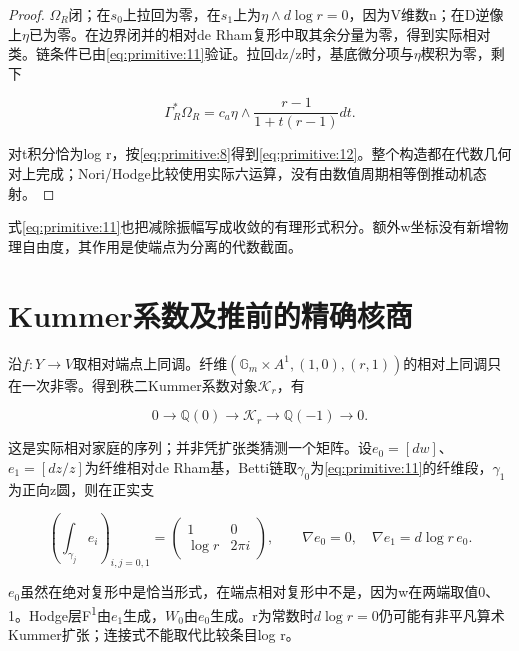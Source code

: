 \documentclass[11pt,a4paper,oneside]{ctexrep}
\theoremstyle{cnplain}
\theoremstyle{definition}
\theoremstyle{remark}
\begin{document}
\begin{proof}

\(\Omega _R\)闭；在\(s_0\)上拉回为零，在\(s_1\)上为\(\eta \wedge d\log  r=0\)，因为V维数n；在D逆像上\(\eta \)已为零。在边界闭并的相对de Rham复形中取其余分量为零，得到实际相对类。链条件已由\eqref{eq:primitive:11}验证。拉回dz/z时，基底微分项与\(\eta \)楔积为零，剩下

\begin{equation}
\Gamma_R^*\Omega_R=c_a\eta\wedge
                  \frac{r-1}{1+t(r-1)}dt.
\end{equation}

对t积分恰为log r，按\eqref{eq:primitive:8}得到\eqref{eq:primitive:12}。整个构造都在代数几何对上完成；Nori/Hodge比较使用实际六运算\cite{tubach}，没有由数值周期相等倒推动机态射。

\end{proof}

式\eqref{eq:primitive:11}也把减除振幅写成收敛的有理形式积分。额外w坐标没有新增物理自由度，其作用是使端点为分离的代数截面。

\section{Kummer系数及推前的精确核商}\label{sec:primitive:5}

沿\(f:Y\to V\)取相对端点上同调。纤维\((\mathbb G_m\times A^{1},{(1,0),(r,1)})\)的相对上同调只在一次非零。得到秩二Kummer系数对象\(\mathcal K_r\)，有

\begin{equation}
0\longrightarrow\mathbb Q(0)\longrightarrow\mathcal K_r
                      \longrightarrow\mathbb Q(-1)\longrightarrow0.       \label{eq:primitive:13}
\end{equation}

这是实际相对家庭的序列；并非凭扩张类猜测一个矩阵。设\(e_0=[dw]\)、\(e_1=[dz/z]\)为纤维相对de Rham基，Betti链取\(\gamma _0\)为\eqref{eq:primitive:11}的纤维段，\(\gamma _1\)为正向z圆，则在正实支

\begin{equation}
\left(\int_{\gamma_j}e_i\right)_{i,j=0,1}
       =\begin{pmatrix}1&0\\\log r&2\pi i\end{pmatrix},\qquad
 \nabla e_0=0,\quad \nabla e_1=d\log r\,e_0.                    \label{eq:primitive:14}
\end{equation}

\(e_0\)虽然在绝对复形中是恰当形式，在端点相对复形中不是，因为w在两端取值0、1。Hodge层F\textsuperscript{1}由\(e_1\)生成，\(W_0\)由\(e_0\)生成。r为常数时\(d\log  r=0\)仍可能有非平凡算术Kummer扩张；连接式不能取代比较条目log r。
\end{document}
